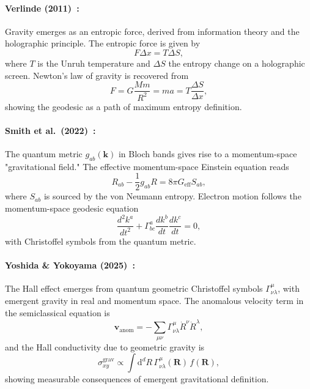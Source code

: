 \paragraph{Verlinde (2011)~\cite{verlinde_origin_2011}:} Gravity emerges as an entropic force, derived from information theory and the holographic principle. The entropic force is given by
\begin{equation}
F \Delta x = T \Delta S,
\end{equation}
where $T$ is the Unruh temperature and $\Delta S$ the entropy change on a holographic screen. Newton's law of gravity is recovered from
\begin{equation}
F = G \frac{Mm}{R^2} = m a = T \frac{\Delta S}{\Delta x},
\end{equation}
showing the geodesic as a path of maximum entropy definition.

\paragraph{Smith et al.\ (2022)~\cite{smith_momentum-space_2022}:} The quantum metric $g_{ab}(\mathbf{k})$ in Bloch bands gives rise to a momentum-space "gravitational field." The effective momentum-space Einstein equation reads
\begin{equation}
R_{ab} - \frac{1}{2}g_{ab}R = 8\pi G_{\mathrm{eff}} S_{ab},
\end{equation}
where $S_{ab}$ is sourced by the von Neumann entropy. Electron motion follows the momentum-space geodesic equation
\begin{equation}
\frac{d^2 k^a}{dt^2} + \Gamma^a_{bc} \frac{dk^b}{dt} \frac{dk^c}{dt} = 0,
\end{equation}
with Christoffel symbols from the quantum metric.

\paragraph{Yoshida \& Yokoyama (2025)~\cite{yoshida_emergent-gravity_2025}:} The Hall effect emerges from quantum geometric Christoffel symbols $\Gamma^\mu_{\nu \lambda}$, with emergent gravity in real and momentum space. The anomalous velocity term in the semiclassical equation is
\begin{equation}
\mathbf{v}_\text{anom} = -\sum_{\mu\nu} \Gamma^\mu_{\nu\lambda} \dot{R}^\nu \dot{R}^\lambda,
\end{equation}
and the Hall conductivity due to geometric gravity is
\begin{equation}
\sigma_{xy}^\text{grav} \propto \int \mathrm{d}^d R \, \Gamma^\mu_{\nu\lambda}(\mathbf{R})\, f(\mathbf{R}),
\end{equation}
showing measurable consequences of emergent gravitational definition.

